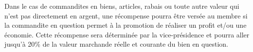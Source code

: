 Dans le cas de commandites en biens, articles, rabais ou toute autre valeur qui n’est pas directement en argent, une récompense pourra être versée au membre si la commandite en question permet à la promotion de réaliser un profit et/ou une économie. Cette récompense sera déterminée par la vice-présidence et pourra aller jusqu’à 20\% de la valeur marchande réelle et courante du bien en question. 

